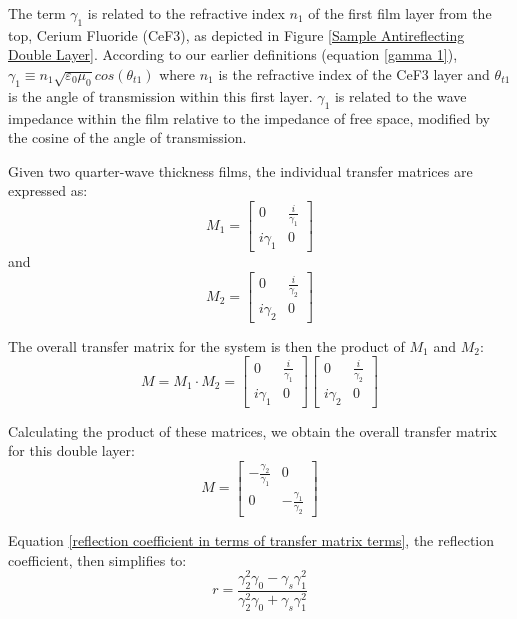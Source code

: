The term $\gamma_1$ is related to the refractive index $n_1$ of the first film layer from the top, Cerium Fluoride (CeF3), as depicted in Figure \ref{Sample Antireflecting Double Layer}. According to our earlier definitions (equation \ref{gamma 1}), $\gamma_1 \equiv n_1 \sqrt{\varepsilon_0\mu_0} cos(\theta_{t1})$ where $n_1$ is the refractive index of the CeF3 layer and $\theta_{t1}$ is the angle of transmission within this first layer. $\gamma_1$ is related to the wave impedance within the film relative to the impedance of free space, modified by the cosine of the angle of transmission.

Given two quarter-wave thickness films, the individual transfer matrices are expressed as:
\[
M_1 = 
    \begin{bmatrix}
        0 & \frac{i}{\gamma_1}  \\
        i\gamma_1 & 0
    \end{bmatrix}
\]
and
\[
M_2 = 
    \begin{bmatrix}
        0 & \frac{i}{\gamma_2}  \\
        i\gamma_2 & 0
    \end{bmatrix}
\]

The overall transfer matrix for the system is then the product of \(M_1\) and \(M_2\):
\[
M = M_1 \cdot M_2 = 
    \begin{bmatrix}
        0 & \frac{i}{\gamma_1}  \\
        i\gamma_1 & 0
    \end{bmatrix}
    \begin{bmatrix}
        0 & \frac{i}{\gamma_2}  \\
        i\gamma_2 & 0
    \end{bmatrix}
\]

Calculating the product of these matrices, we obtain the overall transfer matrix for this double layer:
\[
M = 
    \begin{bmatrix}
        -\frac{\gamma_2}{\gamma_1} & 0 \\
        0 & -\frac{\gamma_1}{\gamma_2}
    \end{bmatrix}
\]


Equation \ref{reflection coefficient in terms of transfer matrix terms}, the reflection coefficient, then simplifies to:
    \begin{equation}\label{reflection coefficient for 2-layer antireflecting films}
    r = \frac{\gamma_2^2\gamma_0 - \gamma_s\gamma_1^2}{\gamma_2^2\gamma_0 + \gamma_s\gamma_1^2}
    \end{equation}

